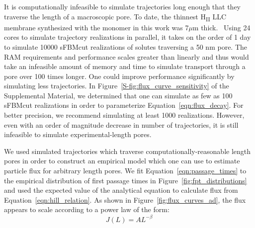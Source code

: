 \documentclass[aps,pre,preprint,groupedaddress,longbibliography]{revtex4-2}
\begin{document}
  It is computationally infeasible to simulate trajectories long enough that
  they traverse the length of a macroscopic pore. To date, the thinnest
  H\textsubscript{II} LLC membrane synthesized with the monomer in this work
  was 7$\mu$m thick.~\cite{feng_thin_2016}
  Using 24 cores to simulate trajectory realizations in
  parallel, it takes on the order of 1 day to simulate 10000 sFBMcut
  realizations of solutes traversing a 50 nm pore. The RAM requirements and
  performance scales greater than linearly and thus would take an infeasible
  amount of memory and time to simulate transport through a pore over 100 times
  longer. One could improve performance significantly by simulating less
  trajectories. In Figure~\ref{S-fig:flux_curve_sensitivity} of the Supplemental
  Material, we determined that one can simulate as few as 100 sFBMcut
  realizations in order to parameterize Equation~\ref{eqn:flux_decay}. For
  better precision, we recommend simulating at least 1000 realizations.
  However, even with an order of magnitude decrease in number of trajectories,
  it is still infeasible to simulate experimental-length pores.
  
  We used simulated trajectories which traverse computationally-reasonable
  length pores in order to construct an empirical model which one can use to
  estimate particle flux for arbitrary length pores. We fit
  Equation~\ref{eqn:passage_times} to the empirical distribution of first
  passage times in Figure~\ref{fig:fpt_distributions} and used the expected
  value of the analytical equation to calculate flux from
  Equation~\ref{eqn:hill_relation}. As shown in
  Figure~\ref{fig:flux_curves_ad}, the flux appears to scale according to a
  power law of the form:
  \begin{equation}
  J(L) = AL^{-\beta} 
  \label{eqn:flux_decay}
  \end{equation}
\end{document}
